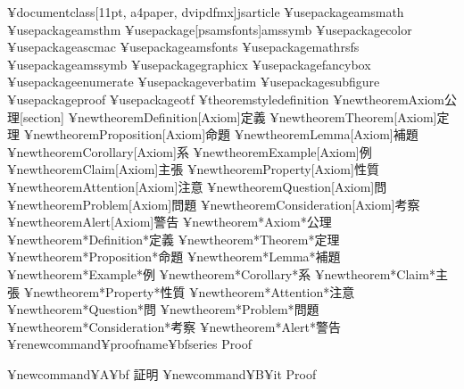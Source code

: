 ¥documentclass[11pt, a4paper, dvipdfmx]{jsarticle}
    ¥usepackage{amsmath}
    ¥usepackage{amsthm}
    ¥usepackage[psamsfonts]{amssymb}
    ¥usepackage{color}
    ¥usepackage{ascmac}
    ¥usepackage{amsfonts}
    ¥usepackage{mathrsfs}
    ¥usepackage{amssymb}
    ¥usepackage{graphicx}
    ¥usepackage{fancybox}
    ¥usepackage{enumerate}
    ¥usepackage{verbatim}
    ¥usepackage{subfigure}
    ¥usepackage{proof}
    ¥usepackage{otf}
    ¥theoremstyle{definition}
   ¥newtheorem{Axiom}{公理}[section]
    ¥newtheorem{Definition}[Axiom]{定義}
    ¥newtheorem{Theorem}[Axiom]{定理}
    ¥newtheorem{Proposition}[Axiom]{命題}
    ¥newtheorem{Lemma}[Axiom]{補題}
    ¥newtheorem{Corollary}[Axiom]{系}
    ¥newtheorem{Example}[Axiom]{例}
    ¥newtheorem{Claim}[Axiom]{主張}
    ¥newtheorem{Property}[Axiom]{性質}
    ¥newtheorem{Attention}[Axiom]{注意}
    ¥newtheorem{Question}[Axiom]{問}
    ¥newtheorem{Problem}[Axiom]{問題}
    ¥newtheorem{Consideration}[Axiom]{考察}
    ¥newtheorem{Alert}[Axiom]{警告}
    ¥newtheorem*{Axiom*}{公理}
    ¥newtheorem*{Definition*}{定義}
    ¥newtheorem*{Theorem*}{定理}
    ¥newtheorem*{Proposition*}{命題}
    ¥newtheorem*{Lemma*}{補題}
    ¥newtheorem*{Example*}{例}
    ¥newtheorem*{Corollary*}{系}
    ¥newtheorem*{Claim*}{主張}
    ¥newtheorem*{Property*}{性質}
    ¥newtheorem*{Attention*}{注意}
    ¥newtheorem*{Question*}{問}
    ¥newtheorem*{Problem*}{問題}
    ¥newtheorem*{Consideration*}{考察}
    ¥newtheorem*{Alert*}{警告}
    ¥renewcommand{¥proofname}{¥bfseries Proof}
    
    ¥newcommand{¥A}{¥bf 証明}
    ¥newcommand{¥B}{¥it Proof}
    
